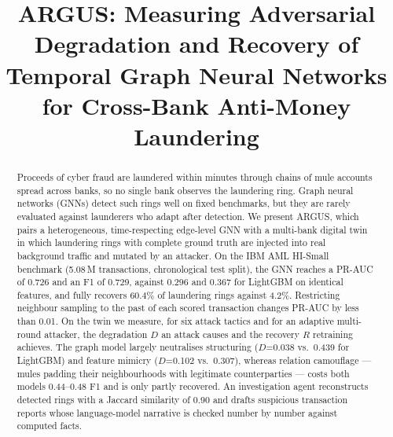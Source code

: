 \documentclass[conference]{IEEEtran}
\begin{document}
\title{ARGUS: Measuring Adversarial Degradation and Recovery of Temporal Graph Neural Networks for Cross-Bank Anti-Money Laundering}

\author{
\and
{}
}

\maketitle

\begin{abstract}
Proceeds of cyber fraud are laundered within minutes through chains of mule accounts spread across banks, so no single bank observes the laundering ring. Graph neural networks (GNNs) detect such rings well on fixed benchmarks, but they are rarely evaluated against launderers who adapt after detection. We present ARGUS, which pairs a heterogeneous, time-respecting edge-level GNN with a multi-bank digital twin in which laundering rings with complete ground truth are injected into real background traffic and mutated by an attacker. On the IBM AML HI-Small benchmark (5.08\,M transactions, chronological test split), the GNN reaches a PR-AUC of 0.726 and an F1 of 0.729, against 0.296 and 0.367 for LightGBM on identical features, and fully recovers 60.4\% of laundering rings against 4.2\%. Restricting neighbour sampling to the past of each scored transaction changes PR-AUC by less than 0.01. On the twin we measure, for six attack tactics and for an adaptive multi-round attacker, the degradation $D$ an attack causes and the recovery $R$ retraining achieves. The graph model largely neutralises structuring ($D$=0.038 vs.\ 0.439 for LightGBM) and feature mimicry ($D$=0.102 vs.\ 0.307), whereas relation camouflage --- mules padding their neighbourhoods with legitimate counterparties --- costs both models 0.44--0.48 F1 and is only partly recovered. An investigation agent reconstructs detected rings with a Jaccard similarity of 0.90 and drafts suspicious transaction reports whose language-model narrative is checked number by number against computed facts.
\end{abstract}
\end{document}
